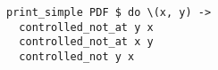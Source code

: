 \begin{verbatim}
print_simple PDF $ do \(x, y) ->
  controlled_not_at y x
  controlled_not_at x y
  controlled_not y x
\end{verbatim}
